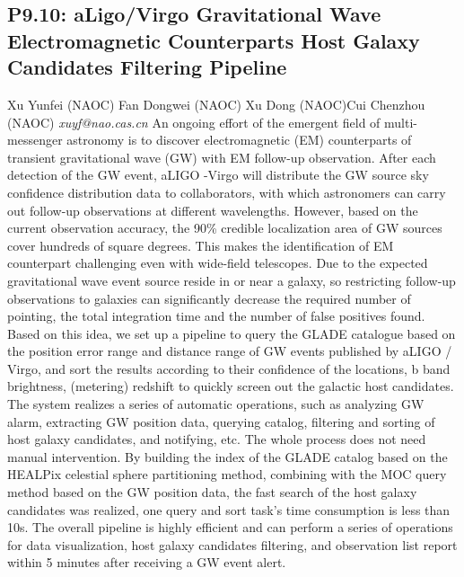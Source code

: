 \documentclass{report}
\begin{document}
\subsection*{P9.10: aLigo/Virgo Gravitational Wave Electromagnetic Counterparts Host Galaxy Candidates Filtering Pipeline}
\bigskip
Xu Yunfei (NAOC) \newline Fan Dongwei (NAOC) \newline  Xu Dong (NAOC)\newline  Cui Chenzhou (NAOC)\newline  \newline  \newline\newline
{\it xuyf@nao.cas.cn}\newline
\newline\newline
An ongoing effort of the emergent field of multi-messenger astronomy is to discover electromagnetic (EM) counterparts of transient gravitational wave (GW) with EM follow-up observation. After each detection of the GW event, aLIGO -Virgo will distribute the GW source sky confidence distribution data to collaborators, with which astronomers can carry out follow-up observations at different wavelengths. However, based on the current observation accuracy, the 90\% credible localization area of GW sources cover hundreds of square degrees. This makes the identification of EM counterpart challenging even with wide-field telescopes. 
Due to the expected gravitational wave event source reside in or near a galaxy, so restricting follow-up observations to galaxies can significantly decrease the required number of pointing, the total integration time and the number of false positives found. Based on this idea, we set up a pipeline to query the GLADE catalogue based on the position error range and distance range of GW events published by aLIGO / Virgo, and sort the results according to their confidence of the locations, b band brightness, (metering) redshift to quickly screen out the galactic host candidates. The system realizes a series of automatic operations, such as analyzing GW alarm, extracting GW position data, querying catalog, filtering and sorting of host galaxy candidates, and notifying, etc. The whole process does not need manual intervention.
By building the index of the GLADE catalog based on the HEALPix celestial sphere partitioning method, combining with the MOC query method based on the GW position data, the fast search of the host galaxy candidates was realized, one query and sort task’s time consumption is less than 10s.
The overall pipeline is highly efficient and can perform a series of operations for data visualization, host galaxy candidates filtering, and observation list report within 5 minutes after receiving a GW event alert.\newline
\newpage
\end{document}
